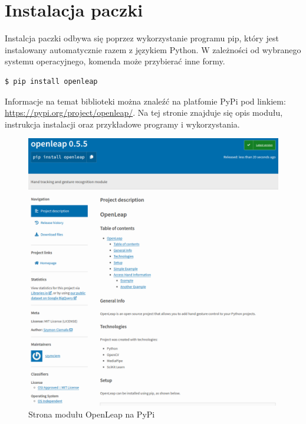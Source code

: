 \section{Instalacja paczki}
\quad Instalcja paczki odbywa się poprzez wykorzystanie programu pip, który jest instalowany automatycznie razem z językiem Python. W zależności od wybranego systemu operacyjnego, komenda może przybierać inne formy. 

\begin{lstlisting}[language=bash]
    $ pip install openleap
\end{lstlisting}

\quad Informacje na temat biblioteki można znaleźć na platfomie PyPi pod linkiem: \href{https://pypi.org/project/openleap/}{https://pypi.org/project/openleap/}. Na tej stronie znajduje się opis modułu, instrukcja instalacji oraz przykładowe programy i wykorzystania.

\begin{figure}[H]
    \begin{center}
        \includegraphics[width=15cm]{../images/pypi_page.png}
        \caption{Strona modułu OpenLeap na PyPi}
    \end{center}
\end{figure}

